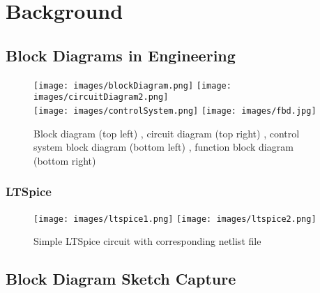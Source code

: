 
\chapter{Background}



\section{Block Diagrams in Engineering}



\begin{figure}[ht!]
\texttt{[image: images/blockDiagram.png]}
\hspace{0.5 cm}
\texttt{[image: images/circuitDiagram2.png]} \\
\texttt{[image: images/controlSystem.png]} 
\hspace{0.5 cm}
\texttt{[image: images/fbd.jpg]} 
\centering
\caption{Block diagram (top left) \cite{wiringDiagrams}, circuit diagram (top right) \cite{engineeronadisk}, control system block diagram (bottom left) \cite{engineeronadisk}, function block diagram (bottom right) \cite{wikicommonsFbd}}
\label{im:blockExample}
\end{figure}




\subsection{LTSpice}



\begin{figure}[ht!]
\centering
\texttt{[image: images/ltspice1.png]}
\texttt{[image: images/ltspice2.png]}
\caption{Simple LTSpice circuit with corresponding netlist file \cite{ltspice}}
\label{im:ltspice}
\end{figure}

\clearpage




\section{Block Diagram Sketch Capture}



